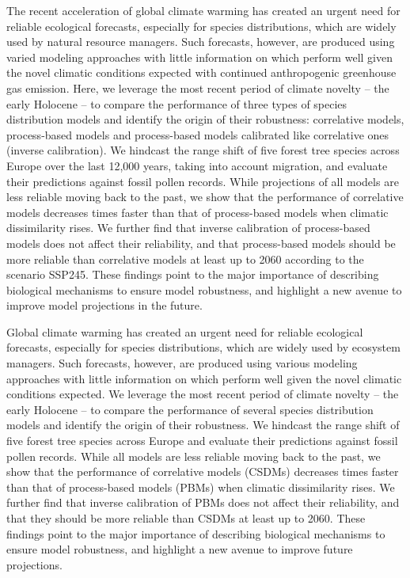 
The recent acceleration of global climate warming has created an urgent need for reliable  ecological forecasts, especially for species distributions, which are widely used by natural resource managers. Such forecasts, however, are produced using varied modeling approaches with little information on which perform well given the novel climatic conditions expected with continued anthropogenic greenhouse gas emission. Here, we leverage the most recent period of climate novelty -- the early Holocene -- to compare the performance of three types of species distribution models and identify the origin of their robustness: correlative models,  process-based models and process-based models calibrated like correlative ones (inverse calibration). We hindcast the range shift of five forest tree species across Europe over the last 12,000 years, taking into account migration, and evaluate their predictions against fossil pollen records. While projections of all models are less reliable moving back to the past, we show that the  performance of correlative models decreases  times faster than that of process-based models when climatic dissimilarity rises. We further find that inverse calibration of process-based models does not affect their reliability, and that process-based models should be more reliable than correlative models at least up to 2060 according to the scenario SSP245. These findings point  to the major importance of describing biological mechanisms to ensure model robustness, and highlight a new avenue to improve model projections in the future.


Global climate warming has created an urgent need for reliable  ecological forecasts, especially for species distributions, which are widely used by ecosystem managers. Such forecasts, however, are produced using various modeling approaches with little information on which perform well given the novel climatic conditions expected.
We leverage the most recent period of climate novelty -- the early Holocene -- to compare the performance of several species distribution models and identify the origin of their robustness. 
We hindcast the range shift of five forest tree species across Europe and evaluate their predictions against fossil pollen records. While all models are less reliable moving back to the past, we show that the  performance of correlative models (CSDMs) decreases  times faster than that of process-based models (PBMs) when climatic dissimilarity rises. We further find that inverse calibration of PBMs does not affect their reliability, and that they should be more reliable than CSDMs at least up to 2060. 
These findings point to the major importance of describing biological mechanisms to ensure model robustness, and highlight a new avenue to improve future projections.


